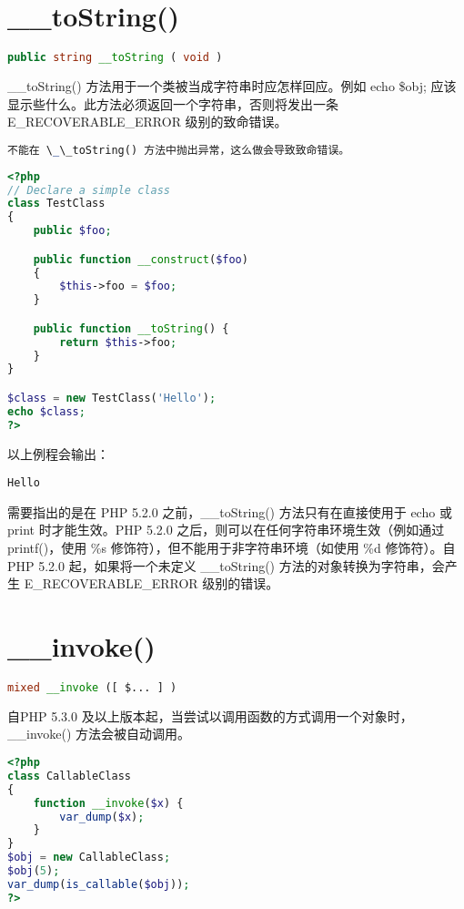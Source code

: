 \section{\_\_toString()}


\begin{lstlisting}[language=PHP]
public string __toString ( void )
\end{lstlisting}

\_\_toString() 方法用于一个类被当成字符串时应怎样回应。例如 echo \$obj; 应该显示些什么。此方法必须返回一个字符串，否则将发出一条 E\_RECOVERABLE\_ERROR 级别的致命错误。

\begin{lstlisting}[language=PHP]
不能在 \_\_toString() 方法中抛出异常，这么做会导致致命错误。
\end{lstlisting}


\begin{lstlisting}[language=PHP]
<?php
// Declare a simple class
class TestClass
{
    public $foo;

    public function __construct($foo) 
    {
        $this->foo = $foo;
    }

    public function __toString() {
        return $this->foo;
    }
}

$class = new TestClass('Hello');
echo $class;
?>
\end{lstlisting}

以上例程会输出：

\begin{verbatim}
Hello
\end{verbatim}

需要指出的是在 PHP 5.2.0 之前，\_\_toString() 方法只有在直接使用于 echo 或 print 时才能生效。PHP 5.2.0 之后，则可以在任何字符串环境生效（例如通过 printf()，使用 \%s 修饰符），但不能用于非字符串环境（如使用 \%d 修饰符）。自 PHP 5.2.0 起，如果将一个未定义 \_\_toString() 方法的对象转换为字符串，会产生 E\_RECOVERABLE\_ERROR 级别的错误。

\section{\_\_invoke()}


\begin{lstlisting}[language=PHP]
mixed __invoke ([ $... ] )
\end{lstlisting}

自PHP 5.3.0 及以上版本起，当尝试以调用函数的方式调用一个对象时，\_\_invoke() 方法会被自动调用。

\begin{lstlisting}[language=PHP]
<?php
class CallableClass 
{
    function __invoke($x) {
        var_dump($x);
    }
}
$obj = new CallableClass;
$obj(5);
var_dump(is_callable($obj));
?>
\end{lstlisting}

